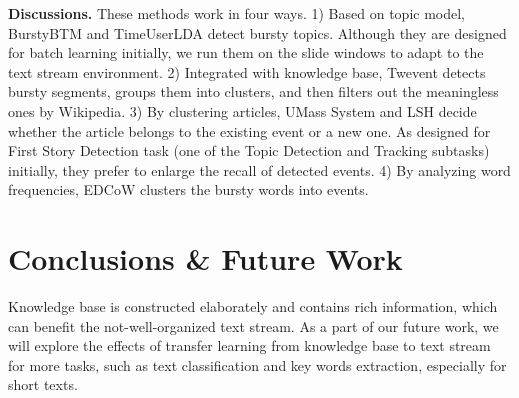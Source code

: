 \documentclass{article}
\begin{document}
\textbf{Discussions.} 
These methods work in four ways. 
1) Based on topic model, BurstyBTM and TimeUserLDA detect bursty topics. 
Although they are designed for batch learning initially, we run them on the slide windows to adapt to the text stream environment.
2) Integrated with knowledge base, Twevent detects bursty segments, groups them into clusters, and then filters out the meaningless ones by Wikipedia.
3) By clustering articles, UMass System and LSH decide whether the article belongs to the existing event or a new one.
As designed for First Story Detection task (one of the Topic Detection and Tracking subtasks\cite{allan2012topic}) initially, they prefer to enlarge the recall of detected events. 
4) By analyzing word frequencies, EDCoW clusters the bursty words into events.

\section{Conclusions \& Future Work}
Knowledge base is constructed elaborately and contains rich information, which can benefit the not-well-organized text stream. 
As a part of our future work, we will explore the effects of transfer learning from knowledge base to text stream for more tasks, such as text classification and key words extraction, especially for short texts. 

\newpage

\small

\end{document}

